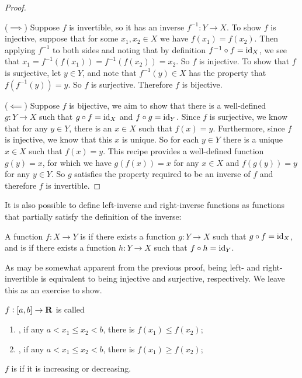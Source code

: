 \begin{proof} \

($\implies$) Suppose $f$ is invertible, so it has an inverse $f^{-1}: Y \to X$. To show $f$ is injective, suppose that for some $x_1, x_2 \in X$ we have $f(x_1) = f(x_2)$. Then applying $f^{-1}$ to both sides and noting that by definition $f^{-1} \circ f = \operatorname{id}_X$, we see that $x_1 = f^{-1}(f(x_1)) = f^{-1}(f(x_2)) = x_2$. So $f$ is injective. To show that $f$ is surjective, let $y \in Y$, and note that $f^{-1}(y) \in X$ has the property that $f(f^{-1}(y)) = y$. So $f$ is surjective. Therefore $f$ is bijective.

($\impliedby$) Suppose $f$ is bijective, we aim to show that there is a well-defined $g:Y \to X$ such that $g \circ f = \operatorname{id}_X$ and $f \circ g = \operatorname{id}_Y$. Since $f$ is surjective, we know that for any $y \in Y$, there is an $x \in X$ such that $f(x) = y$. Furthermore, since $f$ is injective, we know that this $x$ is unique. So for each $y \in Y$ there is a unique $x \in X$ such that $f(x) = y$. This recipe provides a well-defined function $g(y) = x$, for which we have $g(f(x)) = x$ for any $x \in X$ and $f(g(y)) = y$ for any $y \in Y$. So $g$ satisfies the property required to be an inverse of $f$ and therefore $f$ is invertible.
\end{proof}

It is also possible to define left-inverse and right-inverse functions as functions that partially satisfy the definition of the inverse:

\begin{definition}
A function $f:X \to Y$ is  if there exists a function $g:Y \to X$ such that $g \circ f = \operatorname{id}_X$, and is  if there exists a function $h: Y \to X$ such that $f \circ h = \operatorname{id}_Y$.
\end{definition}

As may be somewhat apparent from the previous proof, being left- and right-invertible is equivalent to being injective and surjective, respectively. We leave this as an exercise to show.
\pagebreak

\begin{definition}[Monotonicity]
$f:[a,b]\to\mathbf R$ is called
\begin{enumerate}[label=(\arabic*)]
\item {}, if any $a<x_1\le x_2<b$, there is $f(x_1)\le f(x_2)$;
\item {}, if any $a<x_1\le x_2<b$, there is $f(x_1)\ge f(x_2)$;
\end{enumerate}
$f$ is  if it is increasing or decreasing.
\end{definition}


